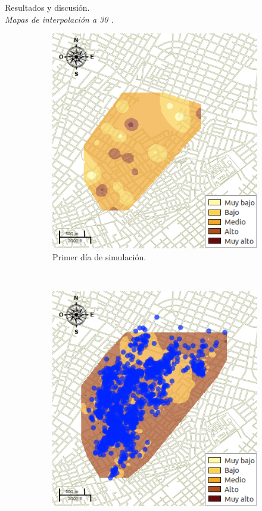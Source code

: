 \begin{frame}[t]{Resultados y discusión.\\\textit{Mapas de interpolación a 30 \textcelsius.}}
    \begin{figure}
    \begin{subfigure}[b]{0.45\textwidth}
        \includegraphics[width=\textwidth]{../book/capitulo-6/graphics/raster/temp-30-0.png}
        \caption{ Primer día de simulación.}
    \end{subfigure}
    ~~~~
    \begin{subfigure}[b]{0.45\textwidth}
        \includegraphics[width=\textwidth]{../book/capitulo-6/graphics/raster/temp-30-35.png}

\end{subfigure}
\end{figure}
\end{frame}

